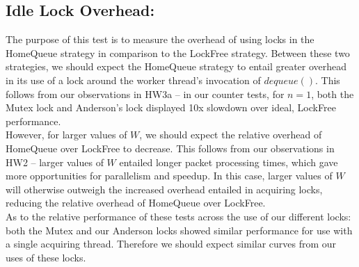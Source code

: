 \documentclass[]{article}
\begin{document}
\subsection{Idle Lock Overhead:}
The purpose of this test is to measure the overhead of using locks in the HomeQueue strategy in comparison to the LockFree strategy. Between these two strategies, we should expect the HomeQueue strategy to entail greater overhead in its use of a lock around the worker thread's invocation of $dequeue()$. This follows from our observations in HW3a -- in our counter tests, for $n = 1$, both the Mutex lock and Anderson's lock displayed 10x slowdown over ideal, LockFree performance.
\\
However, for larger values of $W$, we should expect the relative overhead of HomeQueue over LockFree to decrease. This follows from our observations in HW2 -- larger values of $W$ entailed longer packet processing times, which gave more opportunities for parallelism and speedup. In this case, larger values of $W$ will otherwise outweigh the increased overhead entailed in acquiring locks, reducing the relative overhead of HomeQueue over LockFree.
\\
As to the relative performance of these tests across the use of our different locks: both the Mutex and our Anderson locks showed similar performance for use with a single acquiring thread. Therefore we should expect similar curves from our uses of these locks.
\end{document}
